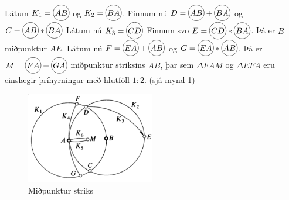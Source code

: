 \begin{frame}
  \begin{hfsmid} \label{hfsmid:midplinu}
    Látum \(K_1 = \hri{AB}\) og \(K_2 = \hri{BA}\).
    Finnum nú
    \(D = \hri{AB}+\hri{BA}\)
    og
    \(C = \hri{AB}*\hri{BA}\)
    Látum nú \(K_3 = \hri{CD}\)
    Finnum svo \(E = \hri{CD}*\hri{BA}\). Þá er \(B\) miðpunktur \(AE\).
    Látum nú
    \(F = \hri{EA}+\hri{AB} \) og
    \(G = \hri{EA}*\hri{AB} \).
    Þá er \(M = \hri{FA}+\hri{GA}\) miðpunktur striksins \(AB\),
    þar sem \(\Delta FAM\) og \(\Delta EFA\) eru einslægir þríhyrningar með
    hlutföll \(1:2\).
   (sjá mynd \ref{fig:mmcon2}) 
  \end{hfsmid}
\end{frame}
\begin{frame}
  \begin{figure}[H]
    \centering
    \includegraphics[width=0.5\textwidth]{MohrMaschCon2.png}
    \caption{Miðpunktur striks}
    \label{fig:mmcon2}
  \end{figure}
\end{frame}


